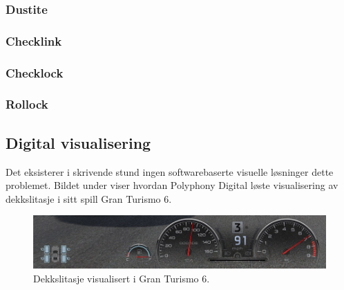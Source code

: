 \subsubsection{Dustite}
\subsubsection{Checklink}
\subsubsection{Checklock}
\subsubsection{Rollock}
\cite{rolllock}

\subsection{Digital visualisering}
Det eksisterer i skrivende stund ingen softwarebaserte visuelle løsninger dette 
problemet. Bildet under viser hvordan Polyphony Digital løste visualisering av 
dekkslitasje i sitt spill Gran Turismo 6.\cite{dekkslitasje-GT6} 
	\newline
	\begin{figure}[H]
		\centering
		\includegraphics[width=1.00\textwidth]{images/gran-turismo-6-screenshot.jpg}
		\caption{Dekkslitasje visualisert i Gran Turismo 6.}
	\end{figure}
